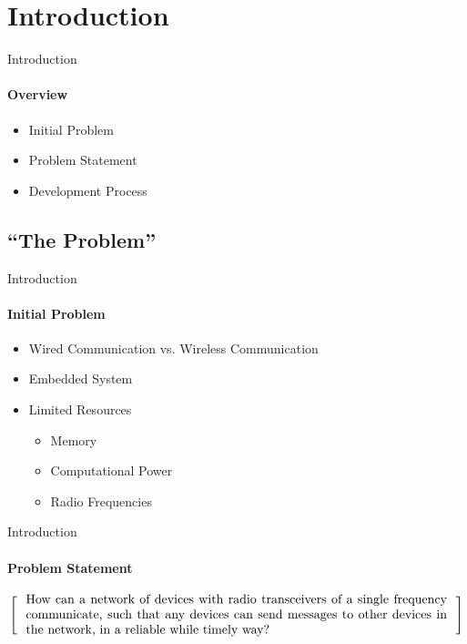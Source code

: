 \section{Introduction}
\begin{frame}{Introduction}\framesubtitle{Overview}
    \begin{itemize}
        \item Initial Problem
        \item Problem Statement
        \item Development Process 
    \end{itemize}
\end{frame}
\subsection{``The Problem''}
\begin{frame}[t]{Introduction}\framesubtitle{Initial Problem}
	\begin{itemize}
        \item Wired Communication vs. Wireless Communication
        \item Embedded System 
        \item Limited Resources
            \begin{itemize}
                \item Memory
                \item Computational Power
                \item Radio Frequencies
            \end{itemize}
    \end{itemize}

\end{frame}
\begin{frame}{Introduction}\framesubtitle{Problem Statement}
\[
\left[
\begin{minipage}{\textwidth}
\centering
\begin{minipage}{0.96\textwidth}
How can a network of devices with radio transceivers of a single frequency communicate, such that any devices can send messages to other devices in the network, in a reliable while timely way?
\end{minipage}
\end{minipage}
\right]
\]
\end{frame}
